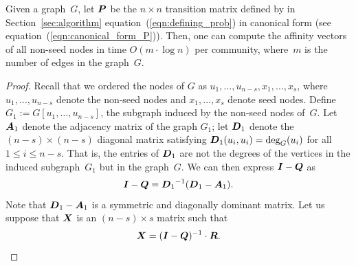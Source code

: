 \begin{theorem}\label{theorem:computing_NR}
Given a graph~$G$, let $\boldsymbol{P}$ be the $n \times n$ transition matrix 
defined by in Section~\ref{sec:algorithm} equation~(\ref{eqn:defining_prob}) in canonical form 
(see equation~(\ref{eqn:canonical_form_P})). Then, one can compute 
the affinity vectors of all non-seed nodes in time $O(m \cdot \log n)$ per community, 
where~$m$ is the number of edges in the graph~$G$.
\end{theorem}  
\begin{proof}
Recall that we ordered the nodes of $G$ as $u_1, \ldots, u_{n - s}, x_1, \ldots, x_s$, 
where $u_1, \ldots, u_{n - s}$ denote the non-seed nodes and $x_1, \ldots, x_s$ denote 
seed nodes. Define $G_1 := G[u_1, \ldots, u_{n - s}]$, the subgraph induced by the non-seed nodes 
of~$G$. Let $\boldsymbol{A}_1$ denote the adjacency matrix of the graph $G_1$; let 
$\boldsymbol{D}_1$ denote the $(n - s) \times (n - s)$ diagonal matrix satisfying 
$\boldsymbol{D}_1(u_i, u_i) = \deg_{G}(u_i)$ for all $1 \leq i \leq n - s$.  That is, the 
entries of $\boldsymbol{D}_1$ are not the degrees of the vertices in the induced subgraph~$G_1$ 
but in the graph~$G$. We can then express 
$\boldsymbol{I} - \boldsymbol{Q}$ as 
\begin{equation} \label{eqn:I-Q}
	\boldsymbol{I}  - \boldsymbol{Q} = {\boldsymbol{D}_1}^{-1} (\boldsymbol{D}_1 - \boldsymbol{A}_1).
\end{equation}
Note that $\boldsymbol{D}_1 - \boldsymbol{A}_1$ is a symmetric and diagonally dominant matrix. 
Let us suppose that $\boldsymbol{X}$ is an $(n - s) \times s$ matrix such that 
\[
	\boldsymbol{X} = (\boldsymbol{I} - \boldsymbol{Q})^{-1} \cdot \boldsymbol{R}.
\]


\end{proof}
